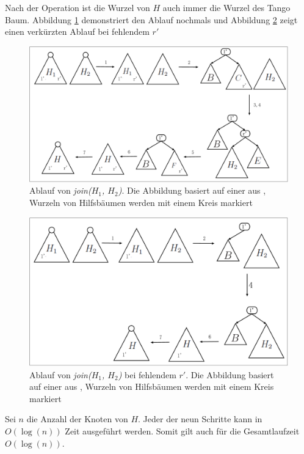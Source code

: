 \documentclass[a4paper,12pt]{article}
\begin{document}
Nach der Operation ist die Wurzel von $H$ auch immer die Wurzel des Tango Baum. Abbildung \ref{fig:join} demonstriert den Ablauf nochmals und Abbildung \ref{fig:join2} zeigt einen verkürzten Ablauf bei fehlendem $r'$
\begin{figure}[H]
	\centering
	\includegraphics[width=1\textwidth]{"Medien/Tango/join"}
	\caption{Ablauf von \textit{join($H_1$, $H_2$)}. Die Abbildung basiert auf einer aus \cite{demainDinamicOpti}, Wurzeln von Hilfsbäumen werden mit einem Kreis markiert }
	\label{fig:join}
\end{figure}
\begin{figure}[H]
	\centering
	\includegraphics[width=1\textwidth]{"Medien/Tango/join2"}
	\caption{Ablauf von  \textit{join($H_1$, $H_2$)} bei fehlendem $r'$. Die Abbildung basiert auf einer aus \cite{demainDinamicOpti}, Wurzeln von Hilfsbäumen werden mit einem Kreis markiert }
	\label{fig:join2}
\end{figure}

\noindent Sei $n$ die Anzahl der Knoten von $H$. Jeder der neun Schritte kann in $O\left(\log \left(n\right)\right)$ Zeit ausgeführt werden. Somit gilt auch für die Gesamtlaufzeit $O\left(\log \left(n\right)\right)$.
\end{document}
